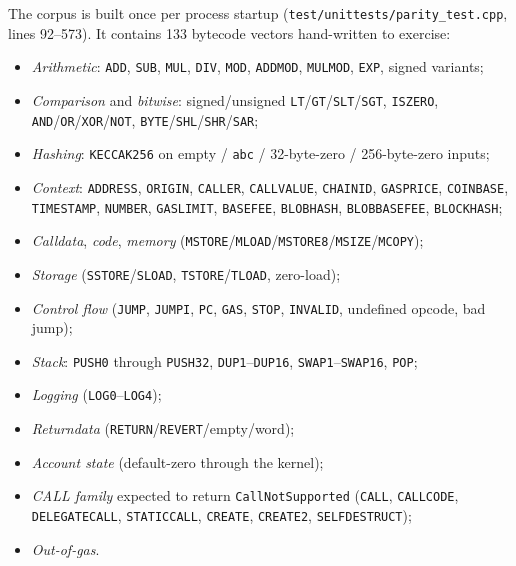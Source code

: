 The corpus is built once per process startup
(\texttt{test/unittests/parity\_test.cpp}, lines 92--573). It contains
\num{133} bytecode vectors hand-written to exercise:

\begin{itemize}
  \item \emph{Arithmetic}: \texttt{ADD}, \texttt{SUB}, \texttt{MUL},
    \texttt{DIV}, \texttt{MOD}, \texttt{ADDMOD}, \texttt{MULMOD},
    \texttt{EXP}, signed variants;
  \item \emph{Comparison} and \emph{bitwise}: signed/unsigned
    \texttt{LT}/\texttt{GT}/\texttt{SLT}/\texttt{SGT}, \texttt{ISZERO},
    \texttt{AND}/\texttt{OR}/\texttt{XOR}/\texttt{NOT},
    \texttt{BYTE}/\texttt{SHL}/\texttt{SHR}/\texttt{SAR};
  \item \emph{Hashing}: \texttt{KECCAK256} on empty / \texttt{abc} /
    32-byte-zero / 256-byte-zero inputs;
  \item \emph{Context}: \texttt{ADDRESS}, \texttt{ORIGIN},
    \texttt{CALLER}, \texttt{CALLVALUE}, \texttt{CHAINID},
    \texttt{GASPRICE}, \texttt{COINBASE}, \texttt{TIMESTAMP},
    \texttt{NUMBER}, \texttt{GASLIMIT}, \texttt{BASEFEE},
    \texttt{BLOBHASH}, \texttt{BLOBBASEFEE}, \texttt{BLOCKHASH};
  \item \emph{Calldata}, \emph{code}, \emph{memory}
    (\texttt{MSTORE}/\texttt{MLOAD}/\texttt{MSTORE8}/\texttt{MSIZE}/\texttt{MCOPY});
  \item \emph{Storage} (\texttt{SSTORE}/\texttt{SLOAD},
    \texttt{TSTORE}/\texttt{TLOAD}, zero-load);
  \item \emph{Control flow} (\texttt{JUMP}, \texttt{JUMPI},
    \texttt{PC}, \texttt{GAS}, \texttt{STOP}, \texttt{INVALID},
    undefined opcode, bad jump);
  \item \emph{Stack}: \texttt{PUSH0} through \texttt{PUSH32},
    \texttt{DUP1}--\texttt{DUP16}, \texttt{SWAP1}--\texttt{SWAP16},
    \texttt{POP};
  \item \emph{Logging} (\texttt{LOG0}--\texttt{LOG4});
  \item \emph{Returndata} (\texttt{RETURN}/\texttt{REVERT}/empty/word);
  \item \emph{Account state} (default-zero through the kernel);
  \item \emph{CALL family} expected to return
    \texttt{CallNotSupported} (\texttt{CALL}, \texttt{CALLCODE},
    \texttt{DELEGATECALL}, \texttt{STATICCALL}, \texttt{CREATE},
    \texttt{CREATE2}, \texttt{SELFDESTRUCT});
  \item \emph{Out-of-gas}.
\end{itemize}

